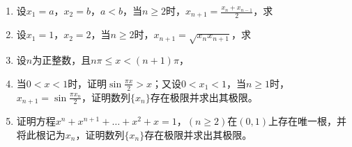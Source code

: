 \begin{enumerate}[{例}1.]
    \item 设$x_1=a$，$x_2=b$，$a<b$，当$n\geq 2$时，$x_{n+1}=\frac{x_n +x_{n-1}}{2}$，求
    \item 设$x_1=1$，$x_2=2$，当$n\geq 2$时，$x_{n+1}=\sqrt{x_n x_{n+1}}$，求
    \item 设$n$为正整数，且$n \pi \leq x < (n+1) \pi$，
    \item 当$0<x<1$时，证明$\sin \frac{\pi x}{2} > x$；又设$0<x_1<1$，当$n\geq 1$时，$x_{n+1}=\sin\frac{\pi x_n}{2}$，证明数列$\{x_n\}$存在极限并求出其极限。
    \item 证明方程$x^n+x^{n+1}+\dots+x^2+x=1$，$(n\geq 2)$在$(0,1)$上存在唯一根，并将此根记为$x_n$，证明数列$\{x_n\}$存在极限并求出其极限。
\end{enumerate}
